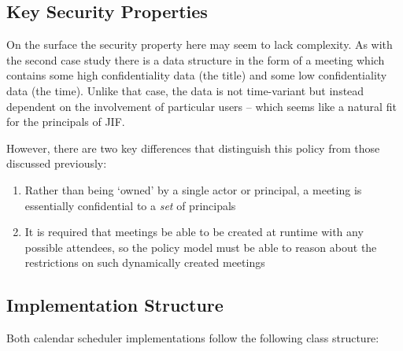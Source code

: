 \subsection{Key Security Properties}

On the surface the security property here may seem to lack complexity. As with the second case study there is a data structure in the form of a meeting which contains some high confidentiality data (the title) and some low confidentiality data (the time). Unlike that case, the data is not time-variant but instead dependent on the involvement of particular users -- which seems like a natural fit for the principals of JIF.

However, there are two key differences that distinguish this policy from those discussed previously:

\begin{enumerate}
	
	\item Rather than being `owned' by a single actor or principal, a meeting is essentially confidential to a \textit{set} of principals
	
	\item It is required that meetings be able to be created at runtime with any possible attendees, so the policy model must be able to reason about the restrictions on such dynamically created meetings
	
\end{enumerate}

\subsection{Implementation Structure}

Both calendar scheduler implementations follow the following class structure:

